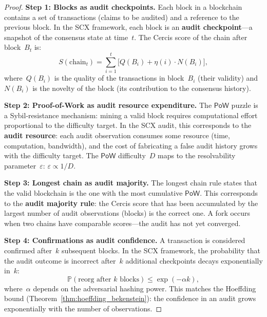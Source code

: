 \documentclass[12pt,a4paper]{article}
\theoremstyle{remark}
\newcommand{\Pbb}{\mathbb{P}}
\newcommand{\SCX}{\textsf{SCX}}
\newcommand{\Cercis}{\textsf{Cercis}}
\newcommand{\PoW}{\textsf{PoW}}
\begin{document}
\begin{proof}
\noindent\textbf{Step 1: Blocks as audit checkpoints.}
Each block in a blockchain contains a set of transactions (claims to be audited) and a reference to the previous block. In the \SCX{} framework, each block is an \textbf{audit checkpoint}---a snapshot of the consensus state at time~$t$. The \Cercis{} score of the chain after block~$B_t$ is:
\begin{equation}
  S(\text{chain}_t) = \sum_{i=1}^t \big[Q(B_i) + \eta(i) \cdot N(B_i)\big],
\end{equation}
where~$Q(B_i)$ is the quality of the transactions in block~$B_i$ (their validity) and~$N(B_i)$ is the novelty of the block (its contribution to the consensus history).

\smallskip
\noindent\textbf{Step 2: Proof-of-Work as audit resource expenditure.}
The $\PoW$ puzzle is a Sybil-resistance mechanism: mining a valid block requires computational effort proportional to the difficulty target. In the \SCX{} audit, this corresponds to the \textbf{audit resource}: each audit observation consumes some resource (time, computation, bandwidth), and the cost of fabricating a false audit history grows with the difficulty target. The $\PoW$ difficulty~$D$ maps to the resolvability parameter~$\varepsilon$: $\varepsilon \propto 1/D$.

\smallskip
\noindent\textbf{Step 3: Longest chain as audit majority.}
The longest chain rule states that the valid blockchain is the one with the most cumulative $\PoW$. This corresponds to the \textbf{audit majority rule}: the \Cercis{} score that has been accumulated by the largest number of audit observations (blocks) is the correct one. A fork occurs when two chains have comparable scores---the audit has not yet converged.

\smallskip
\noindent\textbf{Step 4: Confirmations as audit confidence.}
A transaction is considered confirmed after~$k$ subsequent blocks. In the \SCX{} framework, the probability that the audit outcome is incorrect after~$k$ additional checkpoints decays exponentially in~$k$:
\begin{equation}
  \Pbb(\text{reorg after } k \text{ blocks}) \leq \exp(-\alpha k),
\end{equation}
where~$\alpha$ depends on the adversarial hashing power. This matches the Hoeffding bound (Theorem~\ref{thm:hoeffding_bekenstein}): the confidence in an audit grows exponentially with the number of observations.
\end{proof}
\end{document}
